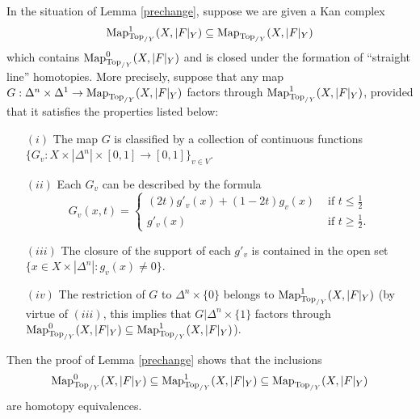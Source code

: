 \begin{remark}\label{postchan}
In the situation of Lemma \ref{prechange}, suppose we are given a Kan complex
$$\operatorname{{Map}}^{1}_{ \operatorname{Top}_{/Y}}( X, |F|_Y) \subseteq \operatorname{{Map}}_{ \operatorname{Top}_{/Y}}( X, |F|_Y)$$ which contains $\operatorname{{Map}}^{0}_{ \operatorname{Top}_{/Y}}(X, |F|_Y)$ and is closed
under the formation of ``straight line'' homotopies. More precisely, suppose that any map
$G: \Delta^n \times \Delta^1 \rightarrow \operatorname{{Map}}_{ \operatorname{Top}_{/Y}}( X, |F|_Y)$ factors through
$\operatorname{{Map}}_{ \operatorname{Top}_{/Y}}^{1}(X, |F|_Y)$, provided that it satisfies the properties listed below:
\begin{itemize} 

\item[$(i)$] The map $G$ is classified by a collection of continuous functions $\{ G_{v}: X \times | \Delta^n| \times [0,1] \rightarrow [0,1] \}_{v \in V}$.

\item[$(ii)$] Each $G_{v}$ can be described by the formula
$$ G_{v}(x, t) = \begin{cases} (2t) g'_{v}(x) + (1-2t) g_{v}(x) & \text{ if } t \leq \frac{1}{2} \\
g'_{v}(x) & \text{ if  } t \geq \frac{1}{2}. \end{cases}$$

\item[$(iii)$] The closure of the support of each $g'_v$ is contained in the open set
$\{ x \in X \times | \Delta^n |: g_v(x) \neq 0 \}$.

\item[$(iv)$] The restriction of $G$ to $\Delta^n \times \{0\}$ belongs to
$\operatorname{{Map}}_{ \operatorname{Top}_{/Y}}^{1}(X, |F|_Y)$ (by virtue of $(iii)$, this implies that
$G| \Delta^n \times \{1\}$ factors through
$ \operatorname{{Map}}_{ \operatorname{Top}_{/Y}}^{0}(X, |F|_Y) \subseteq \operatorname{{Map}}_{ \operatorname{Top}_{/Y}}^{1}(X, |F|_Y)$). 
\end{itemize}
Then the proof of Lemma \ref{prechange} shows that the inclusions
$$ \operatorname{{Map}}^{0}_{ \operatorname{Top}_{/Y}}( X, |F|_Y)
\subseteq \operatorname{{Map}}^{1}_{ \operatorname{Top}_{/Y}}(X, |F|_Y) \subseteq \operatorname{{Map}}_{ \operatorname{Top}_{/Y}}( X, |F|_Y)$$
are homotopy equivalences.
\end{remark}

